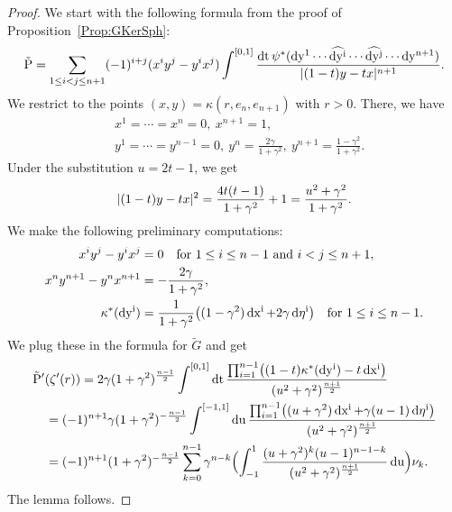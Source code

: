 \documentclass[\MainFolder/Text.tex]{subfiles}
\begin{document}
\begin{proof}
We start with the following formula from the proof of Proposition~\ref{Prop:GKerSph}:
$$ \tilde{\mathrm{P}} =  \sum_{1\le i<j \le n+1} (-1)^{i+j}(x^i y^j - y^i x^j) \int^{[0,1]}  \frac{\operatorname{dt} \psi^*(\operatorname{dy^1} \dotsm \widehat{\operatorname{dy^i}} \dotsm \widehat{\operatorname{dy^j}} \dotsm \operatorname{dy^{n+1}})}{|(1-t)y-tx|^{n+1}}. $$
We restrict to the points $(x,y)=\kappa(r,e_n,e_{n+1})$ with $r>0$. There, we have
\begin{align*}
&x^1= \dotsb =x^n=0,\ x^{n+1}=1, \\
&y^1 = \dotsb = y^{n-1} =0,\ y^n= \frac{2\gamma}{1+\gamma^2},\ y^{n+1} = \frac{1-\gamma^2}{1+\gamma^2}.
\end{align*}
Under the substitution $u = 2t-1$, we get
$$|(1-t)y-t x|^2 = \frac{4 t (t-1)}{1+\gamma^2}+1=\frac{u^2+\gamma^2}{1+\gamma^2}. $$
We make the following preliminary computations:
$$ \begin{aligned}
x^i y^j - y^i x^j & = 0\quad\text{for }1\le i \le n-1\text{ and }i<j\le n+1, \\
x^n y^{n+1} - y^n x^{n+1} & = -\frac{2\gamma}{1+\gamma^2}, \\
\kappa^*(\operatorname{dy^i}) & = \frac{1}{1+\gamma^2}\bigl((1-\gamma^2)\operatorname{dx^i}+ 2\gamma \operatorname{d\eta^i}\bigr)\quad\text{for } 1\le i \le n-1. \end{aligned} $$
We plug these in the formula for $\tilde{G}$ and get
%
\begin{align*}
 &\tilde{\mathrm{P}}'(\zeta'(r)) = 2\gamma(1+\gamma^2)^{\frac{n-1}{2}} \int^{[0,1]}\operatorname{dt}\frac{\prod_{i=1}^{n-1} \bigl((1-t)\kappa^*(\operatorname{dy^i}) - t\operatorname{dx^i}\bigr)}{(u^2+\gamma^2)^{\frac{n+1}{2}}}  \\ 
&\quad=(-1)^{n+1}\gamma(1+\gamma^2)^{-\frac{n-1}{2}}\int^{[-1,1]} \operatorname{du} \frac{\prod_{i=1}^{n-1}\bigl((u+\gamma^2)\operatorname{dx^i} + \gamma(u-1)\operatorname{d\eta^i}\bigr)}{(u^2+\gamma^2)^{\frac{n+1}{2}}}  \\
&\quad =(-1)^{n+1}(1+\gamma^2)^{-\frac{n-1}{2}}\sum_{k=0}^{n-1} \gamma^{n-k}\Bigl( \int_{-1}^1 \frac{(u+\gamma^2)^{k}(u-1)^{n-1-k}}{(u^2+\gamma^2)^{\frac{n+1}{2}}} \operatorname{du}\Bigr) \nu_{k}.
\end{align*}
The lemma follows.
\end{proof}
\end{document}
